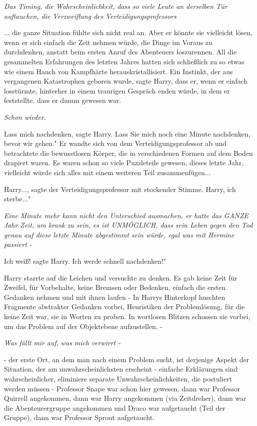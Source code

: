 \emph{Das Timing, die Wahrscheinlichkeit, dass so viele Leute an derselben Tür
auftauchen, die Verzweiflung des Verteidigungsprofessors}

... die ganze Situation fühlte sich nicht real an. Aber er könnte sie vielleicht
lösen, wenn er sich einfach die Zeit nehmen würde, die Dinge im Voraus zu
durchdenken, anstatt beim ersten Anruf des Abenteuers loszurennen. All die
gesammelten Erfahrungen des letzten Jahres hatten sich schließlich zu so etwas
wie einem Hauch von Kampfhärte herauskristallisiert. Ein Instinkt, der aus
vergangenen Katastrophen geboren wurde, sagte Harry, dass er, wenn er einfach
losstürmte, hinterher in einem traurigen Gespräch enden würde, in dem er
feststellte, dass er dumm gewesen war.

\emph{Schon wieder.}

\glqq Lass mich nachdenken\grqq{}, sagte Harry. \glqq Lass Sie mich noch eine
Minute nachdenken, bevor wir gehen." Er wandte sich von dem
Verteidigungsprofessor ab und betrachtete die bewusstlosen Körper, die in
verschiedenen Formen auf dem Boden drapiert waren. Es waren schon so viele
Puzzleteile gewesen, dieses letzte Jahr, vielleicht würde sich alles mit einem
weiteren Teil zusammenfügen...

\glqq Harry...\grqq{}, sagte der Verteidigungsprofessor mit stockender Stimme.
\glqq Harry, ich sterbe..."

\emph{Eine Minute mehr kann nicht den Unterschied ausmachen, er hatte das GANZE
Jahr Zeit, um krank zu sein, es ist UNMÖGLICH, dass sein Leben gegen den Tod
genau auf diese letzte Minute abgestimmt sein würde, egal was mit Hermine
passiert -}

\glqq Ich weiß!\grqq{} sagte Harry. \glqq Ich werde schnell nachdenken!"

Harry starrte auf die Leichen und versuchte zu denken. Es gab keine Zeit für
Zweifel, für Vorbehalte, keine Bremsen oder Bedenken, einfach die ersten
Gedanken nehmen und mit ihnen laufen - In Harrys Hinterkopf huschten Fragmente
abstrakter Gedanken vorbei, Heuristiken der Problemlösung, für die keine Zeit
war, sie in Worten zu proben. In wortlosen Blitzen schossen sie vorbei, um das
Problem auf der Objektebene aufzustellen. -

\emph{Was fällt mir auf, was mich verwirrt -}

- der erste Ort, an dem man nach einem Problem sucht, ist derjenige Aspekt der
Situation, der am unwahrscheinlichsten erscheint - einfache Erklärungen sind
wahrscheinlicher, eliminiere separate Unwahrscheinlichkeiten, die postuliert
werden müssen - Professor Snape war schon hier gewesen, dann war Professor
Quirrell angekommen, dann war Harry angekommen (via Zeitdreher), dann war die
Abenteurergruppe angekommen und Draco war aufgetaucht (Teil der Gruppe), dann
war Professor Sprout aufgetaucht.

